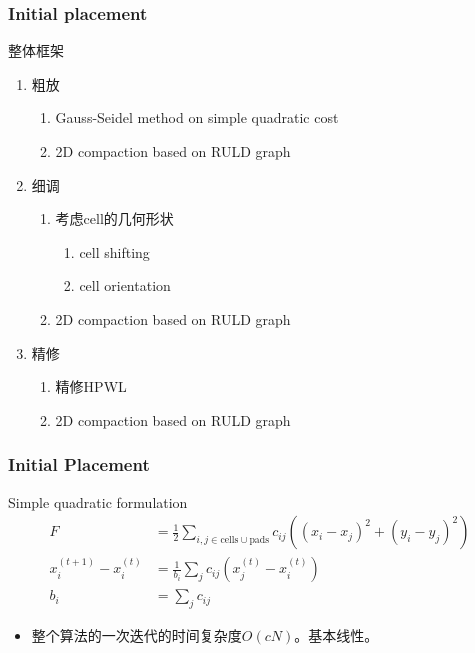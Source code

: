 \documentclass[UTF8,lualatex]{ctexbeamer}
\newcommand{\cells}{\text{cells}}
\newcommand{\pads}{\text{pads}}
\begin{document}
\begin{frame}
    \frametitle{Initial placement}
    
    \begin{block}{整体框架}
        \begin{enumerate}
            \item 粗放
                \begin{enumerate}
                    \item Gauss-Seidel method on simple quadratic cost
                    \item \color{gray}2D compaction based on RULD graph
                \end{enumerate}
            \color{gray}
            \item 细调
                \begin{enumerate}
                    \color{gray}
                    \item 考虑cell的几何形状
                        \begin{enumerate}
                            \color{gray}
                            \item cell shifting
                            \item cell orientation
                        \end{enumerate}
                    \item 2D compaction based on RULD graph
                \end{enumerate}
            \item 精修
                \begin{enumerate}
                    \color{gray}
                    \item 精修HPWL
                    \item 2D compaction based on RULD graph
                \end{enumerate}
        \end{enumerate}
    \end{block}
\end{frame}

\begin{frame}
    \frametitle{Initial Placement}
    
    \begin{block}{Simple quadratic formulation}
        \begin{align*}
            F&=\frac{1}{2}\sum_{i,j\in\cells\cup\pads}c_{ij}((x_i-x_j)^2+(y_i-y_j)^2)
            \\\hline
            x_i^{(t+1)}-x_i^{(t)}&=\frac{1}{b_i}\sum_j c_{ij}(x_j^{(t)}-x_i^{(t)})
            \\
            b_i&=\sum_j c_{ij}
        \end{align*}
        \begin{itemize}
            \item 整个算法的一次迭代的时间复杂度$O(cN)$。基本线性。
        \end{itemize}
    \end{block}
\end{frame}
\end{document}
